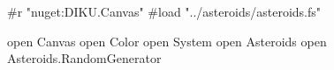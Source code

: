 #r "nuget:DIKU.Canvas"
#load "../asteroids/asteroids.fs"

open Canvas
open Color
open System
open Asteroids
open Asteroids.RandomGenerator
